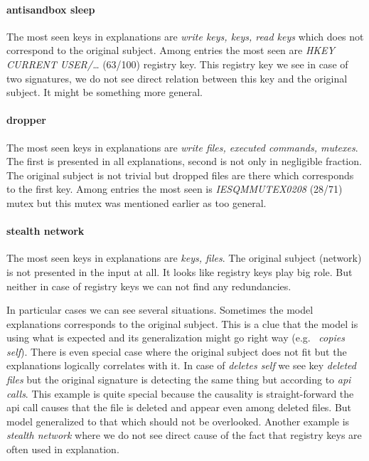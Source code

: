 \paragraph{antisandbox sleep}
The most seen keys in explanations are \emph{write keys, keys, read keys} which does not correspond to the original subject. Among entries the most seen are \emph{HKEY CURRENT USER/\dots} (63/100) registry key. This registry key we see in case of two signatures, we do not see direct relation between this key and the original subject. It might be something more general.

\paragraph{dropper}
The most seen keys in explanations are \emph{write files, executed commands, mutexes}. The first is presented in all explanations, second is not only in negligible fraction. The original subject is not trivial but dropped files are there which corresponds to the first key. Among entries the most seen is \emph{IESQMMUTEX0208} (28/71) mutex but this mutex was mentioned earlier as too general.

\paragraph{stealth network}
The most seen keys in explanations are \emph{keys, files}. The original subject (network) is not presented in the input at all. It looks like registry keys play big role. But neither in case of registry keys we can not find any redundancies.

In particular cases we can see several situations. Sometimes the model explanations corresponds to the original subject. This is a clue that the model is using what is expected and its generalization might go right way (e.g. \ \emph{copies self}). There is even special case where the original subject does not fit but the explanations logically correlates with it. In case of \emph{deletes self} we see key \emph{deleted files} but the original signature is detecting the same thing but according to \emph{api calls}. This example is quite special because the causality is straight-forward the api call causes that the file is deleted and appear even among deleted files. But model generalized to that which should not be overlooked. Another example is \emph{stealth network} where we do not see direct cause of the fact that registry keys are often used in explanation.

